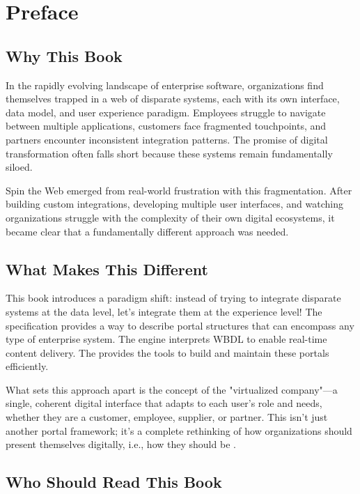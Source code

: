 
\chapter*{Preface}

\section*{Why This Book}

In the rapidly evolving landscape of enterprise software, organizations find themselves trapped in a web of disparate systems, each with its own interface, data model, and user experience paradigm. Employees struggle to navigate between multiple applications, customers face fragmented touchpoints, and partners encounter inconsistent integration patterns. The promise of digital transformation often falls short because these systems remain fundamentally siloed.

Spin the Web emerged from real-world frustration with this fragmentation. After building custom integrations, developing multiple user interfaces, and watching organizations struggle with the complexity of their own digital ecosystems, it became clear that a fundamentally different approach was needed.

\section*{What Makes This Different}

This book introduces a paradigm shift: instead of trying to integrate disparate systems at the data level, let's integrate them at the experience level! The \wbdl specification provides a way to describe portal structures that can encompass any type of enterprise system. The \webspinner engine interprets WBDL to enable real-time content delivery. The \studio provides the tools to build and maintain these portals efficiently.

What sets this approach apart is the concept of the "virtualized company"—a single, coherent digital interface that adapts to each user's role and needs, whether they are a customer, employee, supplier, or partner. This isn't just another portal framework; it's a complete rethinking of how organizations should present themselves digitally, i.e., how they should be \eBranded.

\section*{Who Should Read This Book}

